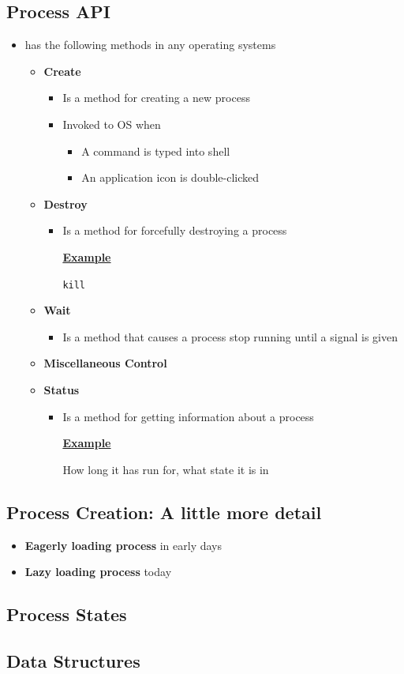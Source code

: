 \documentclass[12pt]{article}
\begin{document}
\subsection{Process API}
\begin{itemize}
    \item has the following methods in any operating systems
    \begin{itemize}
        \item \textbf{Create}
        \begin{itemize}
            \item Is a method for creating a new process
            \item Invoked to OS when
            \begin{itemize}
                \item A command is typed into shell
                \item An application icon is double-clicked
            \end{itemize}
        \end{itemize}
        \item \textbf{Destroy}
        \begin{itemize}
            \item Is a method for forcefully destroying a process

            \bigskip

            \underline{\textbf{Example}}

            \bigskip

            \texttt{kill}
        \end{itemize}
        \item \textbf{Wait}
        \begin{itemize}
            \item Is a method that causes a process stop running until a
            signal is given
        \end{itemize}
        \item \textbf{Miscellaneous Control}
        \item \textbf{Status}
        \begin{itemize}
            \item Is a method for getting information about a process

            \bigskip

            \underline{\textbf{Example}}

            \bigskip

            How long it has run for, what state it is in
        \end{itemize}
    \end{itemize}
\end{itemize}
\subsection{Process Creation: A little more detail}
\begin{itemize}
    \item \textbf{Eagerly loading process} in early days
    \item \textbf{Lazy loading process} today
\end{itemize}
\subsection{Process States}
\subsection{Data Structures}
\end{document}
